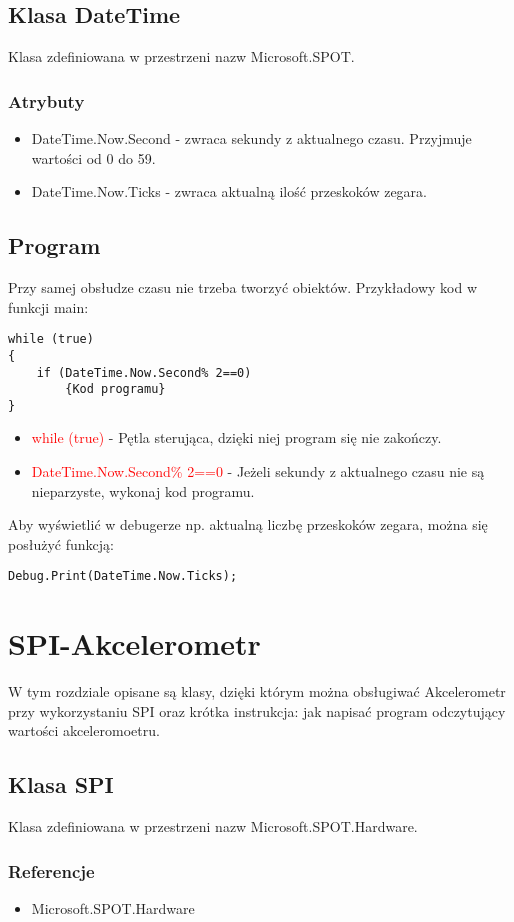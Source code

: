 \documentclass{article}
\begin{document}
\subsection{Klasa DateTime} 
Klasa zdefiniowana w przestrzeni nazw Microsoft.SPOT.
\subsubsection{Atrybuty}
\begin{itemize}
\item DateTime.Now.Second - zwraca sekundy z aktualnego czasu. Przyjmuje wartości od 0 do 59.
\item DateTime.Now.Ticks - zwraca aktualną ilość przeskoków zegara. 
\end{itemize}
\subsection{Program}
Przy samej obsłudze czasu nie trzeba tworzyć obiektów. Przykładowy kod w funkcji main:
\begin{lstlisting}[frame=single]
while (true)
{
	if (DateTime.Now.Second% 2==0)
		{Kod programu}
}
\end{lstlisting}
\begin{itemize}
\item \textcolor{red}{while (true)} - Pętla sterująca, dzięki niej program się nie zakończy.
\item \textcolor{red}{DateTime.Now.Second\% 2==0} - Jeżeli sekundy z aktualnego czasu nie są nieparzyste, wykonaj kod programu.
\end{itemize}
Aby wyświetlić w debugerze np. aktualną liczbę przeskoków zegara, można się posłużyć funkcją:
\begin{lstlisting}[frame=single]
Debug.Print(DateTime.Now.Ticks);
\end{lstlisting}
\section{SPI-Akcelerometr}
W tym rozdziale opisane są klasy, dzięki którym można obsługiwać Akcelerometr przy wykorzystaniu SPI oraz krótka instrukcja: jak napisać program odczytujący wartości akceleromoetru.
\subsection{Klasa SPI}
Klasa zdefiniowana w przestrzeni nazw Microsoft.SPOT.Hardware. 
\subsubsection{Referencje}
\begin{itemize}
\item Microsoft.SPOT.Hardware
\end{itemize}
\end{document}
